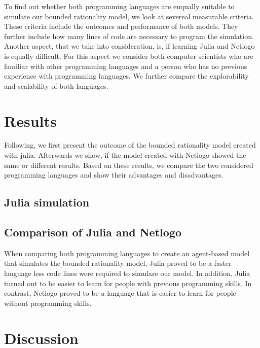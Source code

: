 \documentclass[runningheads]{llncs}
\begin{document}
To find out whether both programming languages are euqually suitable to
simulate our bounded rationality model, we look at severeal measurable
criteria. These criteria include the outcomes and performance of both
models. They further include how many lines of code are necessary to
program the simulation. Another aspect, that we take into consideration,
is, if learning Julia and Netlogo is equally difficult. For this aspect
we consider both computer scientists who are familiar with other
programming languages and a person who has no previous experience with
programming languages. We further compare the explorability and
scalability of both languages.

\hypertarget{results}{%
\section{Results}\label{results}}

Following, we first present the outcome of the bounded rationality model
created with julia. Afterwards we show, if the model created with
Netlogo showed the same or different results. Based on these results, we
compare the two considered programming languages and show their
advantages and disadvantages.

\hypertarget{julia-simulation}{%
\subsection{Julia simulation}\label{julia-simulation}}

\hypertarget{comparison-of-julia-and-netlogo}{%
\subsection{Comparison of Julia and
Netlogo}\label{comparison-of-julia-and-netlogo}}

When comparing both programming languages to create an agent-based model
that simulates the bounded rationality model, Julia proved to be a
faster language less code lines were required to simulare our model. In
addition, Julia turned out to be easier to learn for people with
previous programming skills. In contrast, Netlogo proved to be a
language that is easier to learn for people without programming skills.

\hypertarget{discussion}{%
\section{Discussion}\label{discussion}}
\end{document}
